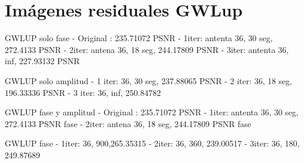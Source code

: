 \chapter{Imágenes residuales GWLup}
\label{finales:apendice2}
GWLUP solo fase
    - Original : 235.71072 PSNR
    - 1iter: antenta 36, 30 seg, 272.4133 PSNR 
    - 2iter: antena 36, 18 seg, 244.17809 PSNR
    - 3iter: antenta 36, inf, 227.93132 PSNR 

GWLUP solo amplitud
    - 1 iter: 36, 30 seg, 237.88065 PSNR
    - 2 iter: 36, 18 seg, 196.33336 PSNR
    - 3 iter: 36, inf, 250.84782

GWLUP fase y amplitud
    - Original : 235.71072 PSNR 
    - 1iter: antenta 36, 30 seg, 272.4133 PSNR fase
    - 2iter: antena 36, 18 seg, 244.17809 PSNR fase

GWLUP fase
    - 1iter: 36, 900,265.35315
    - 2iter: 36, 360, 239.00517
    - 3iter: 36, 180, 249.87689